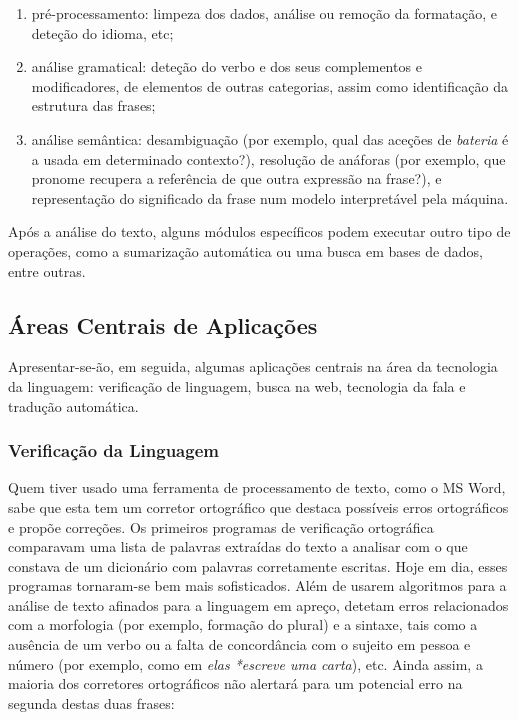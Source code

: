 \begin{multicols}{2}
\begin{enumerate}
 \item pré-processamento: limpeza dos dados, análise ou remoção da formatação, e deteção do idioma, etc; 
      \item análise gramatical: deteção do verbo e dos seus complementos e modificadores, de elementos de outras categorias, assim como identificação da estrutura das frases; 
      \item análise semântica: desambiguação (por exemplo, qual das aceções de \textit{bateria} é a usada em determinado contexto?), resolução de anáforas (por exemplo, que pronome recupera a referência de que outra expressão na frase?), e representação do significado da frase num modelo interpretável pela máquina.
\end{enumerate}

Após a análise do texto, alguns módulos específicos podem executar outro tipo de operações, como a sumarização automática ou uma busca em bases de dados, entre outras.


\subsection{Áreas Centrais de Aplicações} 


Apresentar-se-ão, em seguida, algumas aplicações centrais na área da tecnologia da linguagem: 
verificação de linguagem, busca na web, tecnologia da fala e tradução automática. 


\subsubsection{Verificação da Linguagem}

Quem tiver usado uma ferramenta de processamento de texto, como o MS Word, sabe que esta
tem um corretor ortográfico que destaca possíveis erros ortográficos e propõe correções. 
Os primeiros programas de verificação ortográfica comparavam uma lista de palavras extraídas
do texto a analisar com o que constava de um dicionário com palavras corretamente escritas. 
Hoje em dia, esses programas tornaram-se bem mais sofisticados. 
Além de usarem algoritmos para a análise de texto afinados para a linguagem em apreço, 
detetam erros relacionados com a morfologia (por exemplo, formação do plural) e a sintaxe, 
tais como a ausência de um verbo ou a falta de concordância com o sujeito em pessoa e número
(por exemplo, como em \textit{elas *escreve uma carta}), etc. 
Ainda assim, a maioria dos corretores ortográficos não alertará para um potencial
erro na segunda destas duas frases:
\\


\end{multicols}
